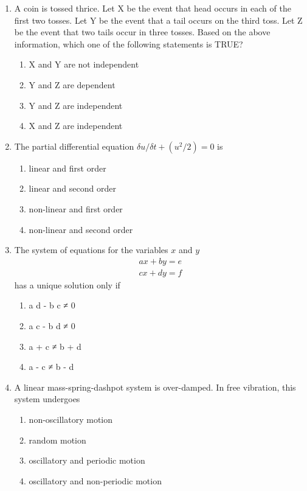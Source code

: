 \documentclass{article}
\begin{document}
\begin{enumerate}
\item A coin is tossed thrice. Let X be the event that head occurs in each of the first two tosses. Let Y be the event that a tail occurs on the third toss. Let Z be the event that two tails occur in three tosses. Based on the above information, which one of the following statements is TRUE?
\begin{enumerate}
\item X and Y are not independent
\item Y and Z are dependent
\item Y and Z are independent
\item X and Z are independent
\end{enumerate}

\item The partial differential equation $\delta u/ \delta t + (u^2/2) = 0$ is
\begin{enumerate}
\item linear and first order
\item linear and second order
\item non-linear and first order
\item non-linear and second order
\end{enumerate}

\item The system of equations for the variables $x$ and $y$
\begin{align}
    a x + b y = e\\
    c x + d y = f
\end{align}
has a unique solution only if
\begin{multicols}{4}
\begin{enumerate}
\item a d - b c ≠ 0
\item a c - b d ≠ 0
\item a + c ≠ b + d
\item a - c ≠ b - d 
\end{enumerate}
\end{multicols}

\item A linear mass-spring-dashpot system is over-damped. In free vibration, this system undergoes
\begin{enumerate}
\item non-oscillatory motion
\item random motion
\item oscillatory and periodic motion
\item oscillatory and non-periodic motion
\end{enumerate}


\end{enumerate}
\end{document}
